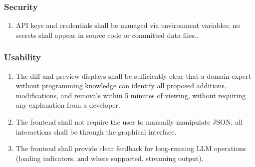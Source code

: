 \documentclass{article}
\def\twodigits#1{%
    \ifnum#1<10 0\fi
    \number#1}%
\begin{document}
\subsubsection*{Security}
\begin{enumerate}[resume,label=\textbf{NFR-\protect\twodigits{\arabic*}:},align=left,leftmargin=1.5cm]
  \item API keys and credentials shall be managed via environment variables; no secrets shall appear in source code or committed data files..
\end{enumerate}

\subsubsection*{Usability}
\begin{enumerate}[resume,label=\textbf{NFR-\protect\twodigits{\arabic*}:},align=left,leftmargin=1.5cm]
  \item The diff and preview displays shall be sufficiently clear that a domain expert without programming knowledge can identify all proposed additions, modifications, and removals within 5 minutes of viewing, without requiring any explanation from a developer.
  \item The frontend shall not require the user to manually manipulate JSON; all interactions shall be through the graphical interface.
  \item The frontend shall provide clear feedback for long-running LLM operations (loading indicators, and where supported, streaming output).
\end{enumerate}
\end{document}
